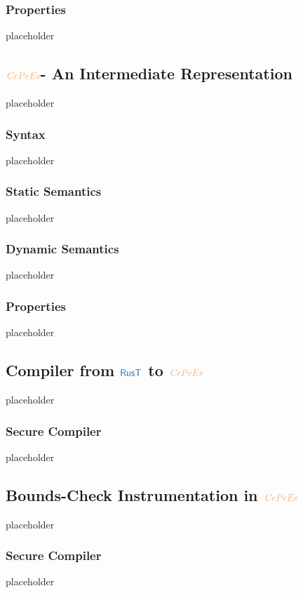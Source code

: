\documentclass[a4paper,12pt]{article}
\begin{document}
\subsubsection{Properties}\label{subsec-rust-properties}
placeholder


\subsection{$\irl{CePeEs}$- An Intermediate Representation}\label{subsec-cepees}
placeholder
\subsubsection{Syntax}\label{subsec-cepees-syntax}
placeholder
\subsubsection{Static Semantics}\label{subsec-cepees-static}
placeholder
\subsubsection{Dynamic Semantics}\label{subsec-cepees-dynamic}
placeholder
\subsubsection{Properties}\label{subsec-cepees-properties}
placeholder


\subsection{Compiler from $\src{RusT}$ to $\irl{CePeEs}$}\label{subsec-rust-to-cepees}
placeholder
\subsubsection{Secure Compiler}\label{subsec-rust-to-cepees-seccomp}
placeholder

\subsection{Bounds-Check Instrumentation in $\irl{CePeEs}$}\label{subsec-softbounds-in-cepees}
placeholder
\subsubsection{Secure Compiler}\label{subsec-softbounds-cepees-seccomp}
placeholder
\end{document}
